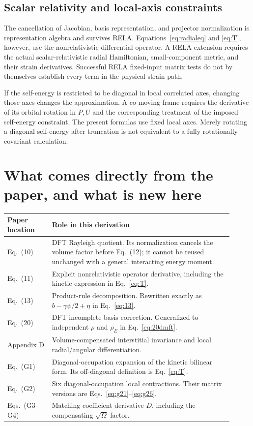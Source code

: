 \documentclass[11pt]{article}
\newcommand{\newpart}[1]{\par\Needspace{12\baselineskip}\section{#1}}
\begin{document}
\subsection{Scalar relativity and local-axis constraints}
The cancellation of Jacobian, basis representation, and projector
normalization is representation algebra and survives RELA.
Equations~\eqref{eq:radialeq} and \eqref{eq:T}, however, use the
nonrelativistic differential operator. A RELA extension requires the
actual scalar-relativistic radial Hamiltonian, small-component metric,
and their strain derivatives. Successful RELA fixed-input matrix tests
do not by themselves establish every term in the physical strain path.

If the self-energy is restricted to be diagonal in local correlated
axes, changing those axes changes the approximation. A co-moving
frame requires the derivative of its orbital rotation in $P,U$ and
the corresponding treatment of the imposed self-energy constraint.
The present formulas use fixed local axes. Merely rotating a diagonal
self-energy after truncation is not equivalent to a fully rotationally
covariant calculation.

\newpart{What comes directly from the paper, and what is new here}
\label{sec:paper}
\begin{longtable}{p{0.18\linewidth}p{0.73\linewidth}}
\toprule
Paper location & Role in this derivation\\
\midrule
Eq.\ (10) & DFT Rayleigh quotient. Its normalization cancels the volume
 factor before Eq.\ (12); it cannot be reused unchanged with a general
 interacting energy moment.\\
Eq.\ (11) & Explicit nonrelativistic operator derivative, including
 the kinetic expression in Eq.~\eqref{eq:T}.\\
Eq.\ (13) & Product-rule decomposition. Rewritten exactly as
 $b-\gamma\psi/2+\eta$ in Eq.~\eqref{eq:13}.\\
Eq.\ (20) & DFT incomplete-basis correction. Generalized to independent
 $\rho$ and $\rho_E$ in Eq.~\eqref{eq:20dmft}.\\
Appendix D & Volume-compensated interstitial invariance and local
 radial/angular differentiation.\\
Eq.\ (G1) & Diagonal-occupation expansion of the kinetic bilinear form.
 Its off-diagonal definition is Eq.~\eqref{eq:T}.\\
Eq.\ (G2) & Six diagonal-occupation local contractions. Their matrix
 versions are Eqs.~\eqref{eq:g21}--\eqref{eq:g26}.\\
Eqs.\ (G3--G4) & Matching coefficient derivative $D$, including the
 compensating $\sqrt\Omega$ factor.\\
\bottomrule
\end{longtable}
\end{document}

